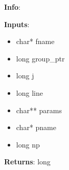 \textbf{Info}:

\noindent \textbf{Inputs}:
\begin{itemize}
\item{char* fname}
\item{long group\_ptr}
\item{long j}
\item{long line}
\item{char** params}
\item{char* pname}
\item{long np}
\end{itemize}

\noindent \textbf{Returns}: long
